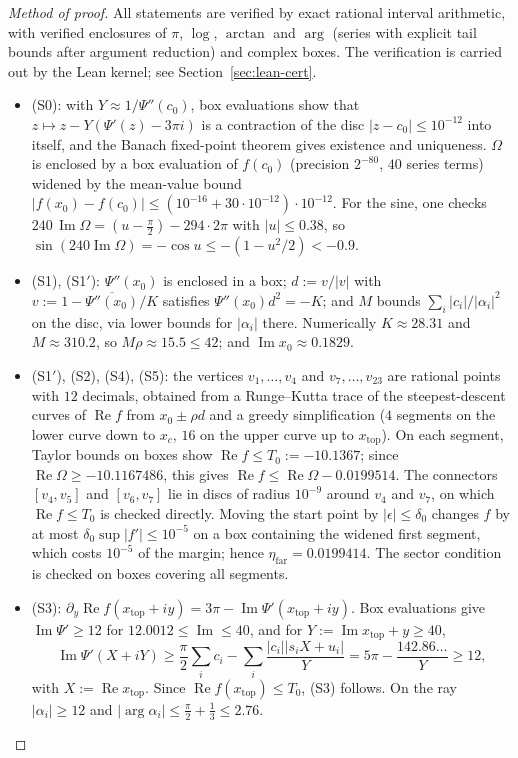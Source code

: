 \documentclass[11pt]{amsart}
\theoremstyle{definition}
\theoremstyle{remark}
\numberwithin{equation}{section}
\newcommand{\etafar}{\eta_{\mathrm{far}}}
\newcommand{\xtop}{x_{\mathrm{top}}}
\renewcommand{\Re}{\operatorname{Re}}
\renewcommand{\Im}{\operatorname{Im}}
\begin{document}
\begin{proof}[Method of proof]
All statements are verified by exact rational interval arithmetic, with verified enclosures of $\pi$, $\log$,
$\arctan$ and $\arg$ (series with explicit tail bounds after argument reduction) and complex boxes. The verification
is carried out by the Lean kernel; see Section~\ref{sec:lean-cert}.
\begin{itemize}
\item (S0): with $Y\approx1/\Psi''(c_0)$, box evaluations show that $z\mapsto z-Y(\Psi'(z)-3\pi i)$ is a contraction
  of the disc $|z-c_0|\le10^{-12}$ into itself, and the Banach fixed-point theorem gives existence and uniqueness.
  $\Omega$ is enclosed by a box evaluation of $f(c_0)$ (precision $2^{-80}$, $40$ series terms) widened by the
  mean-value bound $|f(x_0)-f(c_0)|\le(10^{-16}+30\cdot10^{-12})\cdot10^{-12}$. For the sine, one checks
  $240\,\Im\Omega=(u-\frac\pi2)-294\cdot2\pi$ with $|u|\le0.38$, so $\sin(240\Im\Omega)=-\cos u\le-(1-u^2/2)<-0.9$.
\item (S1), (S1$'$): $\Psi''(x_0)$ is enclosed in a box; $d:=v/|v|$ with $v:=1-\overline{\Psi''(x_0)}/K$ satisfies
  $\Psi''(x_0)d^2=-K$; and $M$ bounds $\sum_i|c_i|/|\alpha_i|^2$ on the disc, via lower bounds for $|\alpha_i|$
  there. Numerically $K\approx28.31$ and $M\approx310.2$, so $M\rho\approx15.5\le42$; and $\Im x_0\approx0.1829$.
\item (S1$'$), (S2), (S4), (S5): the vertices $v_1,\dots,v_4$ and $v_7,\dots,v_{23}$ are rational points with $12$ decimals, obtained
  from a Runge--Kutta trace of the steepest-descent curves of $\Re f$ from $x_0\pm\rho d$ and a greedy
  simplification ($4$ segments on the lower curve down to $x_c$, $16$ on the upper curve up to $\xtop$). On each
  segment, Taylor bounds on boxes show $\Re f\le T_0:=-10.1367$; since $\Re\Omega\ge-10.1167486$, this gives
  $\Re f\le\Re\Omega-0.0199514$. The connectors $[v_4,v_5]$ and $[v_6,v_7]$ lie in discs of radius $10^{-9}$ around
  $v_4$ and $v_7$, on which $\Re f\le T_0$ is checked directly. Moving the start point by $|\epsilon|\le\delta_0$
  changes $f$ by at most $\delta_0\sup|f'|\le10^{-5}$ on a box containing the widened first segment, which costs
  $10^{-5}$ of the margin; hence $\etafar=0.0199414$. The sector condition is checked on boxes covering all
  segments.
\item (S3): $\partial_y\Re f(\xtop+iy)=3\pi-\Im\Psi'(\xtop+iy)$. Box evaluations give $\Im\Psi'\ge12$ for
  $12.0012\le\Im\le40$, and for $Y:=\Im\xtop+y\ge40$,
  \[
    \Im\Psi'(X+iY)\ge\frac\pi2\sum_ic_i-\sum_i\frac{|c_i||s_iX+u_i|}{Y}=5\pi-\frac{142.86\ldots}{Y}\ge12,
  \]
  with $X:=\Re\xtop$. Since $\Re f(\xtop)\le T_0$, (S3) follows. On the ray $|\alpha_i|\ge12$ and
  $|\arg\alpha_i|\le\frac\pi2+\frac13\le2.76$.\qedhere
\end{itemize}
\end{proof}
\end{document}
